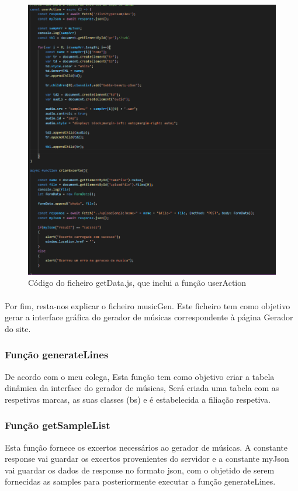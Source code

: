\documentclass{report}
\begin{document}
\begin{figure}[!h]
\center 
\includegraphics[width=330pt]{img/getdata.png}
\caption{Código do ficheiro getData.js, que inclui a função userAction}
\label{fig:userAction}
\end{figure}

\paragraph{}

Por fim, resta-nos explicar o ficheiro musicGen. Este ficheiro tem como objetivo gerar a interface gráfica 
do gerador de músicas correspondente à página Gerador do site.

\subsubsection{Função generateLines}
\label{ssec:generateLines}
\hspace{5pt}De acordo com o meu colega, Esta função tem como objetivo criar a tabela dinâmica da interface 
do gerador de músicas, Será criada uma tabela com as respetivas marcas, as suas classes (\ac{bs}) e é 
estabelecida a filiação respetiva.

\subsubsection{Função getSampleList}
\label{ssec:getSampleList}
\hspace{5pt}Esta função fornece os excertos necessários ao gerador de músicas. A constante response vai 
guardar os excertos provenientes do servidor e a constante myJson vai guardar os dados de response no formato 
\ac{json}, com o objetido de serem fornecidas as samples para posteriormente executar a função generateLines.
\end{document}
